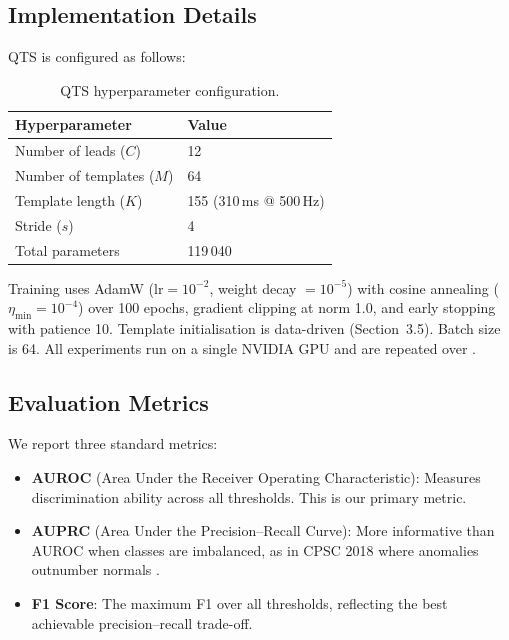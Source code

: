 \documentclass{iopjournal}
\begin{document}
\subsection{Implementation Details}

QTS is configured as follows:

\begin{table}[h]
\centering
\caption{QTS hyperparameter configuration.}
\label{tab:hyper}
\begin{tabular}{ll}
\hline
Hyperparameter & Value \\
\hline
Number of leads ($C$) & 12 \\
Number of templates ($M$) & 64 \\
Template length ($K$) & 155 (310\,ms @ 500\,Hz) \\
Stride ($s$) & 4 \\
Total parameters & 119\,040 \\
\hline
\end{tabular}
\end{table}

Training uses AdamW ($\mathrm{lr} = 10^{-2}$, weight decay $= 10^{-5}$) with cosine annealing ($\eta_\mathrm{min} = 10^{-4}$) over 100 epochs, gradient clipping at norm 1.0, and early stopping with patience 10. Template initialisation is data-driven (Section~3.5). Batch size is 64. All experiments run on a single NVIDIA GPU  and are repeated over . 

\subsection{Evaluation Metrics}

We report three standard metrics:
\begin{itemize}
\item \textbf{AUROC} (Area Under the Receiver Operating Characteristic): Measures discrimination ability across all thresholds. This is our primary metric.
\item \textbf{AUPRC} (Area Under the Precision--Recall Curve): More informative than AUROC when classes are imbalanced, as in CPSC 2018 where anomalies outnumber normals .
\item \textbf{F1 Score}: The maximum F1 over all thresholds, reflecting the best achievable precision--recall trade-off. 
\end{itemize}
\end{document}
